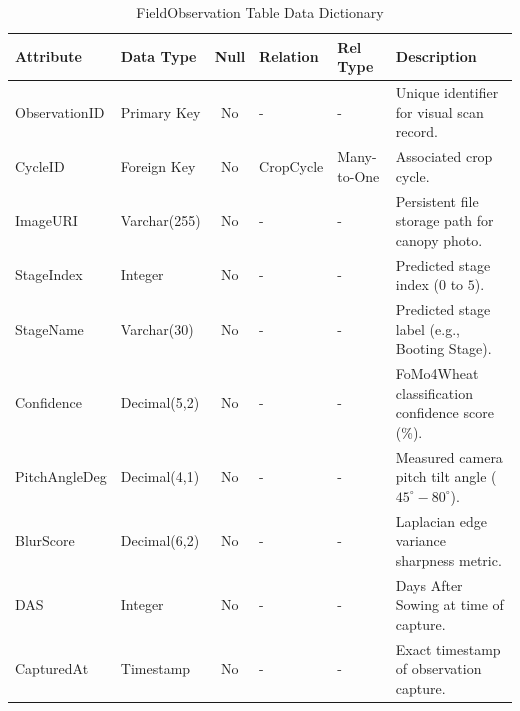 \begin{table}[H]
\footnotesize
\centering
\caption{FieldObservation Table Data Dictionary}
\label{tab:observation_table}
\begin{tabular}{|l|l|c|l|l|p{4.5cm}|}
\hline
\textbf{Attribute} & \textbf{Data Type} & \textbf{Null} & \textbf{Relation} & \textbf{Rel Type} & \textbf{Description} \\ \hline
ObservationID & Primary Key & No & - & - & Unique identifier for visual scan record. \\ \hline
CycleID & Foreign Key & No & CropCycle & Many-to-One & Associated crop cycle. \\ \hline
ImageURI & Varchar(255) & No & - & - & Persistent file storage path for canopy photo. \\ \hline
StageIndex & Integer & No & - & - & Predicted stage index ($0$ to $5$). \\ \hline
StageName & Varchar(30) & No & - & - & Predicted stage label (e.g., Booting Stage). \\ \hline
Confidence & Decimal(5,2) & No & - & - & FoMo4Wheat classification confidence score (\%). \\ \hline
PitchAngleDeg & Decimal(4,1) & No & - & - & Measured camera pitch tilt angle ($45^\circ - 80^\circ$). \\ \hline
BlurScore & Decimal(6,2) & No & - & - & Laplacian edge variance sharpness metric. \\ \hline
DAS & Integer & No & - & - & Days After Sowing at time of capture. \\ \hline
CapturedAt & Timestamp & No & - & - & Exact timestamp of observation capture. \\ \hline
\end{tabular}
\end{table}

